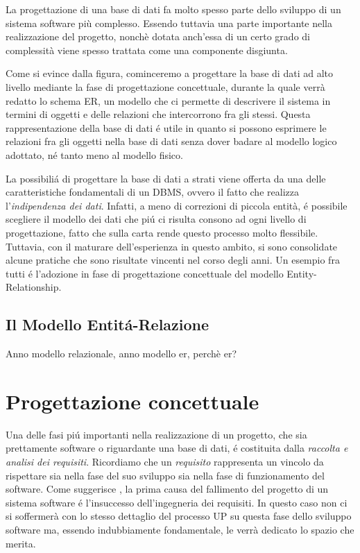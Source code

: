 \documentclass[12pt,a4paper,onecolumn,x11names]{article}
\begin{document}
	\begin{flushleft}
		La progettazione di una base di dati fa molto spesso parte dello sviluppo di un sistema software più complesso. Essendo tuttavia una parte importante nella realizzazione del progetto, nonchè dotata anch'essa di un certo grado di complessità viene spesso trattata come una componente disgiunta.\newline
		
		Come si evince dalla figura, cominceremo a progettare la base di dati ad alto livello mediante la fase di progettazione concettuale, durante la quale verrà redatto lo schema ER, un modello che ci permette di descrivere il sistema in termini di oggetti e delle relazioni che intercorrono fra gli stessi. Questa rappresentazione della base di dati \'{e} utile in quanto si possono  esprimere le relazioni fra gli oggetti nella base di dati senza dover badare al modello logico adottato, n\'{e} tanto meno al modello fisico.\newline
		
		La possibili\'{a} di progettare la base di dati a strati viene offerta da una delle caratteristiche fondamentali di un DBMS, ovvero il fatto che realizza l'\textit{indipendenza dei dati}. Infatti, a meno di correzioni di piccola entità, \'{e} possibile scegliere il modello dei dati che pi\'{u} ci risulta consono ad ogni livello di progettazione, fatto che sulla carta rende questo processo molto flessibile. Tuttavia, con il maturare dell'esperienza in questo ambito, si sono consolidate alcune pratiche che sono risultate vincenti nel corso degli anni. Un esempio fra tutti \'{e} l'adozione in fase di progettazione concettuale del modello Entity-Relationship.\newpage
	\end{flushleft}

\subsection{Il Modello Entit\'{a}-Relazione}
	\begin{flushleft}
		Anno modello relazionale, anno modello er, perchè er?
	\end{flushleft}


\newpage

\section{Progettazione concettuale}

	Una delle fasi pi\'{u} importanti nella realizzazione di un progetto, che sia prettamente software o riguardante una base di dati, \'{e} costituita dalla \textit{raccolta e analisi dei requisiti}. Ricordiamo che un \textit{requisito} rappresenta un vincolo da rispettare sia nella fase del suo sviluppo sia nella fase di funzionamento del software. Come suggerisce \cite{Arlow}, la prima causa del fallimento del progetto di un sistema software \'{e} l'insuccesso dell'ingegneria dei requisiti. In questo caso non ci si soffermerà con lo stesso dettaglio del processo UP su questa fase dello sviluppo software ma, essendo indubbiamente fondamentale, le verrà dedicato lo spazio che merita.
	\newline
	
\end{document}
